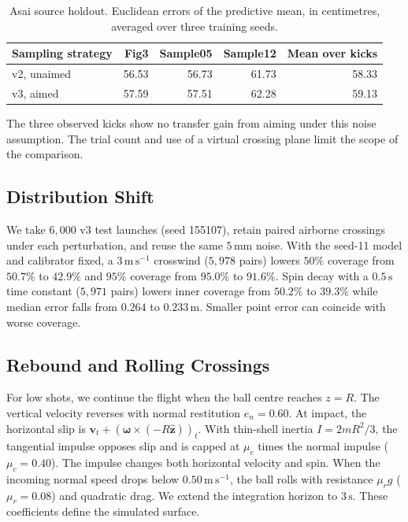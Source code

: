 \documentclass[11pt,a4paper]{article}
\begin{document}
\begin{table}[htbp]
  \centering
  \small
  \caption{Asai source holdout. Euclidean errors of the predictive mean, in centimetres, averaged over three training seeds.}
  \label{tab:asai}
  \begin{tabular}{lrrrr}
    \toprule
    Sampling strategy & Fig3 & Sample05 & Sample12 & Mean over kicks \\
    \midrule
    v2, unaimed & 56.53 & 56.73 & 61.73 & 58.33 \\
    v3, aimed   & 57.59 & 57.51 & 62.28 & 59.13 \\
    \bottomrule
  \end{tabular}
\end{table}

The three observed kicks show no transfer gain from aiming under this noise assumption. The trial count and use of a virtual crossing plane limit the scope of the comparison.

\subsection{Distribution Shift}
\label{sec:shift}

We take $6{,}000$ v3 test launches (seed 155107), retain paired airborne crossings under each perturbation, and reuse the same $5\,\mathrm{mm}$ noise. With the seed-11 model and calibrator fixed, a $3\,\mathrm{m\,s^{-1}}$ crosswind ($5{,}978$ pairs) lowers $50\%$ coverage from $50.7\%$ to $42.9\%$ and $95\%$ coverage from $95.0\%$ to $91.6\%$. Spin decay with a $0.5\,\mathrm{s}$ time constant ($5{,}971$ pairs) lowers inner coverage from $50.2\%$ to $39.3\%$ while median error falls from $0.264$ to $0.233\,\mathrm{m}$. Smaller point error can coincide with worse coverage.

\subsection{Rebound and Rolling Crossings}
\label{sec:bounce}

For low shots, we continue the flight when the ball centre reaches $z=R$. The vertical velocity reverses with normal restitution $e_n=0.60$. At impact, the horizontal slip is $\mathbf v_t+(\boldsymbol\omega\times(-R\hat{\mathbf z}))_t$. With thin-shell inertia $I=2mR^2/3$, the tangential impulse opposes slip and is capped at $\mu_c$ times the normal impulse ($\mu_c=0.40$). The impulse changes both horizontal velocity and spin. When the incoming normal speed drops below $0.50\,\mathrm{m\,s^{-1}}$, the ball rolls with resistance $\mu_r g$ ($\mu_r=0.08$) and quadratic drag. We extend the integration horizon to $3\,\mathrm{s}$. These coefficients define the simulated surface.
\end{document}
